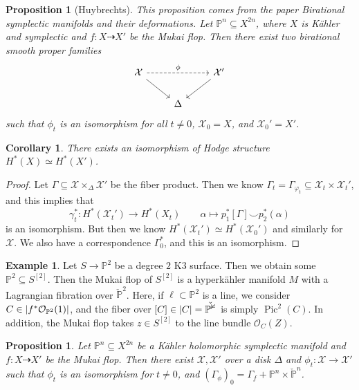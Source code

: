 \documentclass[leqno, openany]{memoir}
\newtheorem{cor}[thm]{Corollary}
\newtheorem{prop}[thm]{Proposition}
\theoremstyle{definition}
\newtheorem{exm}[thm]{Example}
\theoremstyle{remark}
\theoremstyle{plain}
\theoremstyle{definition}
\theoremstyle{remark}
\renewcommand{\P}{\mathbb{P}}
\newcommand{\mc}[1]{\mathcal{#1}}
\DeclareMathOperator{\Pic}{Pic}
\begin{document}
\begin{prop}[Huybrechts]\label{prop:biratdefs}
    This proposition comes from the paper \textit{Birational symplectic manifolds and their deformations}. Let $\P^n \subseteq X^{2n}$, where $X$ is K\"ahler and symplectic and $f \colon X \dashrightarrow X'$ be the Mukai flop. Then there exist two birational smooth proper families
    \begin{equation*}
    \begin{tikzcd}
        \mc{X} \ar[dashrightarrow]{rr}{\phi} \ar{dr} & & \mc{X}' \ar{dl} \\
        & \Delta
    \end{tikzcd}
    \end{equation*}
    such that $\phi_t$ is an isomorphism for all $t \neq 0$, $\mc{X}_0 = X$, and $\mc{X}_0' = X'$.
\end{prop}

\begin{cor}
    There exists an isomorphism of Hodge structure $H^*(X) \simeq H^*(X')$.
\end{cor}

\begin{proof}
    Let $\Gamma \subseteq \mc{X} \times_{\Delta} \mc{X}'$ be the fiber product. Then we know $\Gamma_t = \Gamma_{\varphi_t} \subseteq \mc{X}_t \times \mc{X}_t'$, and this implies that
    \[ \gamma_t^* \colon H^*(\mc{X}_t') \to H^*(X_t) \qquad \alpha \mapsto p_1^* [\Gamma] \smile p_2^*(\alpha) \]
    is an isomorphism. But then we know $H^*(\mc{X}_t') \simeq H^*(\mc{X}_0')$ and similarly for $\mc{X}$. We also have a correspondence $\Gamma_0^*$, and this is an isomorphism.
\end{proof}

\begin{exm}
    Let $S \to \P^2$ be a degree $2$ K3 surface. Then we obtain some $\P^2 \subseteq S^{[2]}$. Then the Mukai flop of $S^{[2]}$ is a hyperk\"ahler manifold $M$ with a Lagrangian fibration over $\check{\P}^2$. Here, if $\ell \subset \P^2$ is a line, we consider $C \in \abs{f^* \mc{O}_{\P^2}(1)}$, and the fiber over $[C] \in\abs{C} = \check{\P^2}$ is simply $\Pic^2(C)$. In addition, the Mukai flop takes $z \in S^{[2]}$ to the line bundle $\mc{O}_C(Z)$.
\end{exm}

\begin{prop}
    Let $\P^n \subseteq X^{2n}$ be a K\"ahler holomorphic symplectic manifold and $f \colon X \dashrightarrow X'$ be the Mukai flop. Then there exist $\mc{X}, \mc{X}'$ over a disk $\Delta$ and $\phi_t \colon \mc{X} \to \mc{X}'$ such that $\phi_t$ is an isomorphism for $t \neq 0$, and ${(\Gamma_{\phi})}_0 = \Gamma_f + \P^n \times \check{\P}^n$.
\end{prop}
\end{document}
